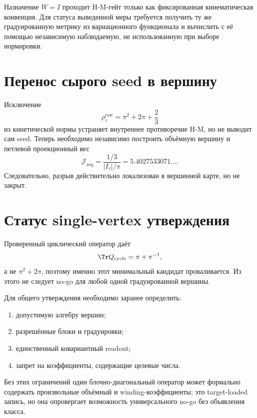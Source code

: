 \begin{nogocriterion}
Назначение \(W=I\) проходит H-M-гейт только как фиксированная кинематическая
конвенция. Для статуса выведенной меры требуется получить ту же
градуированную метрику из вариационного функционала и вычислить с её помощью
независимую наблюдаемую, не использованную при выборе нормировки.
\end{nogocriterion}

\section{Перенос сырого seed в вершину}

Исключение
\begin{equation}
 \rho_\tau^{\mathrm{raw}}
 =\pi^2+2\pi+\frac23
\end{equation}
из кинетической нормы устраняет внутреннее противоречие H-M, но не выводит
сам seed. Теперь необходимо независимо построить объёмную вершину и
петлевой проекционный вес
\begin{equation}
 \mathcal J_{\mathrm{req}}
 =\frac{1/3}{|I_\tau|/\pi}
 =5.4027533071\ldots.
\end{equation}
Следовательно, разрыв действительно локализован в вершинной карте, но не
закрыт.

\section{Статус single-vertex утверждения}

Проверенный циклический оператор даёт
\begin{equation}
 \Tr Q_{\mathrm{cycle}}=\pi+\pi^{-1},
\end{equation}
а не \(\pi^2+2\pi\), поэтому именно этот минимальный кандидат проваливается.
Из этого не следует no-go для любой одной градуированной вершины.

Для общего утверждения необходимо заранее определить:
\begin{enumerate}
 \item допустимую алгебру вершин;
 \item разрешённые блоки и градуировки;
 \item единственный ковариантный readout;
 \item запрет на коэффициенты, содержащие целевые числа.
\end{enumerate}
Без этих ограничений один блочно-диагональный оператор может формально
содержать произвольные объёмный и winding-коэффициенты; это target-loaded
запись, но она опровергает возможность универсального no-go без объявления
класса.

